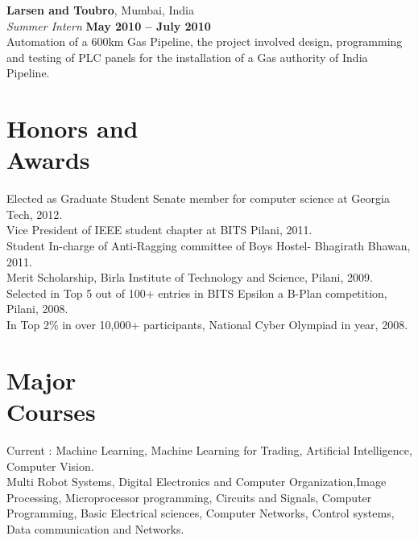 \documentclass[margin,line]{resume}
\begin{document}
\begin{resume}
    \textbf{Larsen and Toubro}, Mumbai, India \vspace{2mm}\\\vspace{1mm}%
    \textsl{Summer Intern} \hfill \textbf{May 2010 -- July 2010}\\
    Automation of a 600km Gas Pipeline, the project involved design, programming and testing of PLC panels for the installation of a Gas authority of India Pipeline.

    \section{\mysidestyle Honors and\\Awards} 
    Elected as Graduate Student Senate member for computer science at Georgia Tech, 2012.\vspace{1mm}\\%
    Vice President of IEEE student chapter at BITS Pilani, 2011.    \vspace{1mm}\\%
    Student In-charge of Anti-Ragging committee of Boys Hostel- Bhagirath Bhawan, 2011.  \vspace{1mm}\\%
    Merit Scholarship, Birla Institute of Technology and Science, Pilani, 2009.              \vspace{1mm}\\%
    Selected in Top 5 out of 100+ entries in BITS Epsilon a B-Plan competition, Pilani, 2008.          \vspace{1mm}\\%
    In Top 2\% in over 10,000+ participants, National Cyber Olympiad in year, 2008.   \\%
 

    \section{\mysidestyle Major\\Courses}
    Current : Machine Learning, Machine Learning for Trading, Artificial Intelligence, Computer Vision. \vspace{1mm}\\
    Multi Robot Systems, Digital Electronics and Computer Organization,Image Processing, Microprocessor programming, Circuits and
    Signals, Computer Programming, Basic Electrical sciences, Computer Networks, Control systems, 
    Data communication and Networks. \\     


\end{resume}
\end{document}
